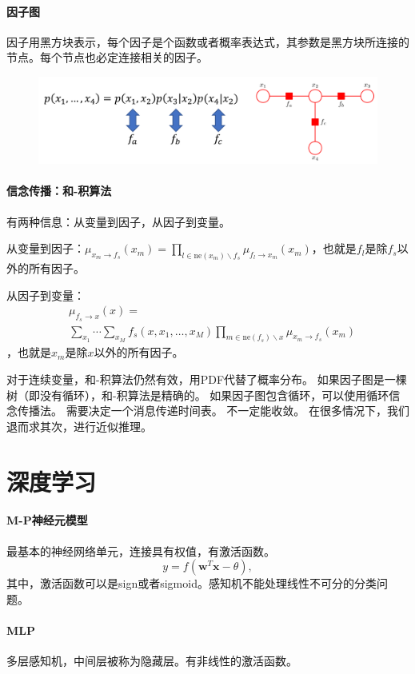 \paragraph{因子图}
因子用黑方块表示，每个因子是个函数或者概率表达式，其参数是黑方块所连接的节点。每个节点也必定连接相关的因子。

\begin{figure}[H]
    \centering
\includegraphics[width=0.7\columnwidth]{sl/factor.png}
\end{figure}

\paragraph{信念传播：和-积算法}
有两种信息：从变量到因子，从因子到变量。

从变量到因子：$\mu_{x_m \to f_s}(x_m) = \prod_{l \in \mathrm{ne}(x_m) \backslash f_s} \mu_{f_l \to x_m}(x_m)$，也就是$f_l$是除$f_s$以外的所有因子。

从因子到变量：$$
\begin{aligned}
&\mu_{f_s \to x}(x) = \\
&\sum_{x_1}\! \cdots\! \sum_{x_M}\! f_s(x,x_1,\! \ldots,\! x_M)\! \prod_{m \in \mathrm{ne}(f_s)\! \backslash\!  x}\! \mu_{x_m\! \to\! f_s}(x_m)
\end{aligned}
$$，也就是$x_m$是除$x$以外的所有因子。

对于连续变量，和-积算法仍然有效，用PDF代替了概率分布。
如果因子图是一棵树（即没有循环），和-积算法是精确的。
如果因子图包含循环，可以使用循环信念传播法。
需要决定一个消息传递时间表。
不一定能收敛。
在很多情况下，我们退而求其次，进行近似推理。

\section{深度学习}
\paragraph{M-P神经元模型}
最基本的神经网络单元，连接具有权值，有激活函数。
$$y = f(\bm w^T\bm x - \theta),$$
其中，激活函数可以是sign或者sigmoid。感知机不能处理线性不可分的分类问题。

\paragraph{MLP}
多层感知机，中间层被称为隐藏层。有非线性的激活函数。

